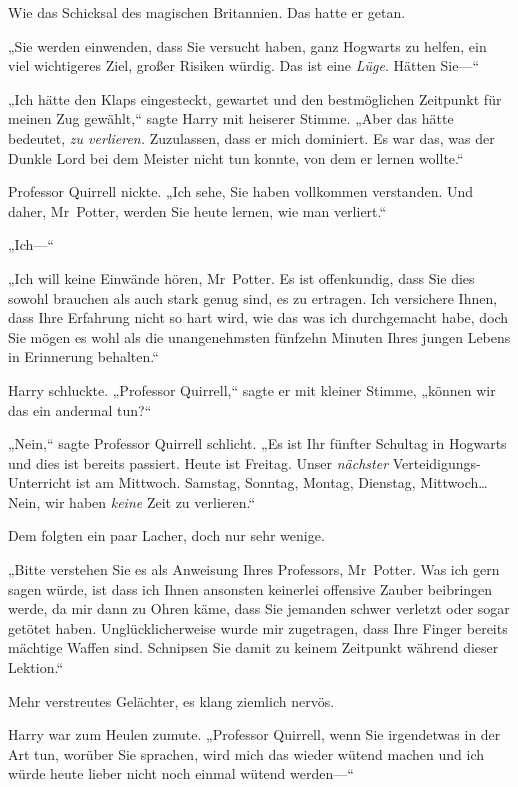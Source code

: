 {Wie das Schicksal des magischen Britannien. Das hatte er getan.

„Sie werden einwenden, dass Sie versucht haben, ganz Hogwarts zu helfen, ein viel wichtigeres Ziel, großer Risiken würdig. Das ist eine \emph{Lüge}. Hätten Sie—“

„Ich hätte den Klaps eingesteckt, gewartet und den bestmöglichen Zeitpunkt für meinen Zug gewählt,“ sagte Harry mit heiserer Stimme. „Aber das hätte bedeutet, \emph{zu verlieren.} Zuzulassen, dass er mich dominiert. Es war das, was der Dunkle Lord bei dem Meister nicht tun konnte, von dem er lernen wollte.“

Professor Quirrell nickte. „Ich sehe, Sie haben vollkommen verstanden. Und daher, Mr~Potter, werden Sie heute lernen, wie man verliert.“

„Ich—“

„Ich will keine Einwände hören, Mr~Potter. Es ist offenkundig, dass Sie dies sowohl brauchen als auch stark genug sind, es zu ertragen. Ich versichere Ihnen, dass Ihre Erfahrung nicht so hart wird, wie das was ich durchgemacht habe, doch Sie mögen es wohl als die unangenehmsten fünfzehn Minuten Ihres jungen Lebens in Erinnerung behalten.“

Harry schluckte. „Professor Quirrell,“ sagte er mit kleiner Stimme, „können wir das ein andermal tun?“

„Nein,“ sagte Professor Quirrell schlicht. „Es ist Ihr fünfter Schultag in Hogwarts und dies ist bereits passiert. Heute ist Freitag. Unser \emph{nächster} Verteidigungs-Unterricht ist am Mittwoch. Samstag, Sonntag, Montag, Dienstag, Mittwoch… Nein, wir haben \emph{keine} Zeit zu verlieren.“

Dem folgten ein paar Lacher, doch nur sehr wenige.

„Bitte verstehen Sie es als Anweisung Ihres Professors, Mr~Potter. Was ich gern sagen würde, ist dass ich Ihnen ansonsten keinerlei offensive Zauber beibringen werde, da mir dann zu Ohren käme, dass Sie jemanden schwer verletzt oder sogar getötet haben. Unglücklicherweise wurde mir zugetragen, dass Ihre Finger bereits mächtige Waffen sind. Schnipsen Sie damit zu keinem Zeitpunkt während dieser Lektion.“

Mehr verstreutes Gelächter, es klang ziemlich nervös.

Harry war zum Heulen zumute. „Professor Quirrell, wenn Sie irgendetwas in der Art tun, worüber Sie sprachen, wird mich das wieder wütend machen und ich würde heute lieber nicht noch einmal wütend werden—“

}
